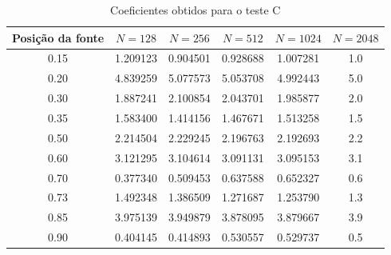 \documentclass[12pt]{article}
\begin{document}
\begin{spacing}{1.5}
\vspace{0.5cm}
\begin{table}[H]
\centering
\begin{tabular}{c c c c c c} 
\hline\hline 
\rule{0pt}{3ex} 
Posição da fonte & $N=128$ & $N=256$ & $N=512$ & $N=1024$ & $N=2048$\\ [0.5ex] 
\hline 
\rule{0pt}{4ex}
        0.15 & 1.209123 & 0.904501 & 0.928688 & 1.007281 & 1.0 \\ 
        0.20 & 4.839259 & 5.077573 & 5.053708 & 4.992443 & 5.0 \\ 
        0.30 & 1.887241 & 2.100854 & 2.043701 & 1.985877 & 2.0 \\ 
        0.35 & 1.583400 & 1.414156 & 1.467671 & 1.513258 & 1.5 \\
        0.50 & 2.214504 & 2.229245 & 2.196763 & 2.192693 & 2.2 \\ 
        0.60 & 3.121295 & 3.104614 & 3.091131 & 3.095153 & 3.1 \\
        0.70 & 0.377340 & 0.509453 & 0.637588 & 0.652327 & 0.6 \\
        0.73 & 1.492348 & 1.386509 & 1.271687 & 1.253790 & 1.3 \\
        0.85 & 3.975139 & 3.949879 & 3.878095 & 3.879667 & 3.9 \\
        0.90 & 0.404145 & 0.414893 & 0.530557 & 0.529737 & 0.5 \\
        [1ex]
\hline
\end{tabular}
    \caption{Coeficientes obtidos para o teste C}
    \label{tabelaCoefc}
\end{table}


\end{spacing}
\end{document}

